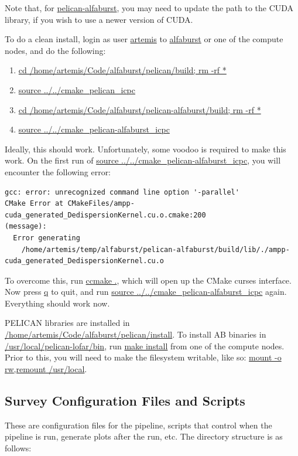 \documentclass{article}
\begin{document}
Note that, for \url{pelican-alfaburst}, you may need to update the path to the
CUDA library, if you wish to use a newer version of CUDA.

To do a clean install, login as user \url{artemis} to \url{alfaburst} or one of
the compute nodes, and do the following:

\begin{enumerate}
\item \url{cd /home/artemis/Code/alfaburst/pelican/build; rm -rf *}
\item \url{source ../../cmake_pelican_icpc}
\item \url{cd /home/artemis/Code/alfaburst/pelican-alfaburst/build; rm -rf *}
\item \url{source ../../cmake_pelican-alfaburst_icpc}
\end{enumerate}

Ideally, this should work. Unfortunately, some voodoo is required to make this
work. On the first run of \url{source
../../cmake_pelican-alfaburst_icpc}, you will encounter the following error:

\small {
\begin{verbatim}
gcc: error: unrecognized command line option '-parallel'
CMake Error at CMakeFiles/ampp-cuda_generated_DedispersionKernel.cu.o.cmake:200
(message):
  Error generating
    /home/artemis/temp/alfaburst/pelican-alfaburst/build/lib/./ampp-cuda_generated_DedispersionKernel.cu.o
\end{verbatim}
}

To overcome this, run \url{ccmake .}, which will open up the CMake curses
interface. Now press \url{q} to quit, and run \url{source
../../cmake_pelican-alfaburst_icpc} again. Everything should work now.

PELICAN libraries are installed in
\url{/home/artemis/Code/alfaburst/pelican/install}. To install AB binaries in
\url{/usr/local/pelican-lofar/bin}, run \url{make install} from one of the
compute nodes. Prior to this, you will need to make the filesystem writable,
like so: \url{mount -o rw,remount /usr/local}.


\subsection{Survey Configuration Files and Scripts}

These are configuration files for the pipeline, scripts that control when the
pipeline is run, generate plots after the run, etc. The directory structure is
as follows:
\end{document}
